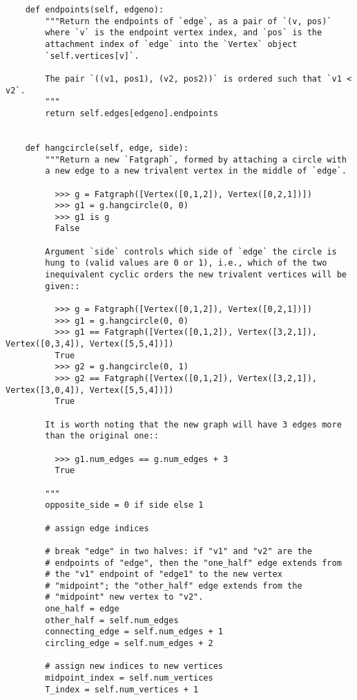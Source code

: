 \begin{lstlisting}
    def endpoints(self, edgeno):
        """Return the endpoints of `edge`, as a pair of `(v, pos)`
        where `v` is the endpoint vertex index, and `pos` is the
        attachment index of `edge` into the `Vertex` object
        `self.vertices[v]`.

        The pair `((v1, pos1), (v2, pos2))` is ordered such that `v1 < v2`.
        """
        return self.edges[edgeno].endpoints


    def hangcircle(self, edge, side):
        """Return a new `Fatgraph`, formed by attaching a circle with
        a new edge to a new trivalent vertex in the middle of `edge`.

          >>> g = Fatgraph([Vertex([0,1,2]), Vertex([0,2,1])])
          >>> g1 = g.hangcircle(0, 0)
          >>> g1 is g
          False
          
        Argument `side` controls which side of `edge` the circle is
        hung to (valid values are 0 or 1), i.e., which of the two
        inequivalent cyclic orders the new trivalent vertices will be
        given::
        
          >>> g = Fatgraph([Vertex([0,1,2]), Vertex([0,2,1])])
          >>> g1 = g.hangcircle(0, 0)
          >>> g1 == Fatgraph([Vertex([0,1,2]), Vertex([3,2,1]), Vertex([0,3,4]), Vertex([5,5,4])])
          True
          >>> g2 = g.hangcircle(0, 1)
          >>> g2 == Fatgraph([Vertex([0,1,2]), Vertex([3,2,1]), Vertex([3,0,4]), Vertex([5,5,4])])
          True

        It is worth noting that the new graph will have 3 edges more
        than the original one::

          >>> g1.num_edges == g.num_edges + 3
          True
          
        """
        opposite_side = 0 if side else 1

        # assign edge indices
        
        # break "edge" in two halves: if "v1" and "v2" are the
        # endpoints of "edge", then the "one_half" edge extends from
        # the "v1" endpoint of "edge1" to the new vertex
        # "midpoint"; the "other_half" edge extends from the
        # "midpoint" new vertex to "v2".
        one_half = edge
        other_half = self.num_edges
        connecting_edge = self.num_edges + 1
        circling_edge = self.num_edges + 2
        
        # assign new indices to new vertices
        midpoint_index = self.num_vertices
        T_index = self.num_vertices + 1


\end{lstlisting}
